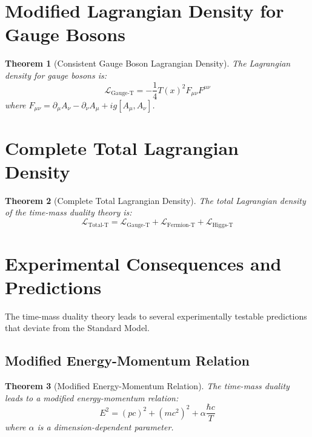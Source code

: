 \documentclass[a4paper,12pt]{article}
\newtheorem{theorem}{Theorem}[section]
\begin{document}
	\section{Modified Lagrangian Density for Gauge Bosons}
	
	\begin{theorem}[Consistent Gauge Boson Lagrangian Density]
		The Lagrangian density for gauge bosons is:
		\begin{equation}
			\mathcal{L}_{\text{Gauge-T}} = -\frac{1}{4} T(x)^2 F_{\mu\nu} F^{\mu\nu}
		\end{equation}
		where \( F_{\mu\nu} = \partial_\mu A_\nu - \partial_\nu A_\mu + i g [A_\mu, A_\nu] \).
	\end{theorem}
	
	\section{Complete Total Lagrangian Density}
	
	\begin{theorem}[Complete Total Lagrangian Density]
		The total Lagrangian density of the time-mass duality theory is:
		\begin{equation}
			\mathcal{L}_{\text{Total-T}} = \mathcal{L}_{\text{Gauge-T}} + \mathcal{L}_{\text{Fermion-T}} + \mathcal{L}_{\text{Higgs-T}}
		\end{equation}
	\end{theorem}
	
	\section{Experimental Consequences and Predictions}
	
	The time-mass duality theory leads to several experimentally testable predictions that deviate from the Standard Model.
	
	\subsection{Modified Energy-Momentum Relation}
	
	\begin{theorem}[Modified Energy-Momentum Relation]
		The time-mass duality leads to a modified energy-momentum relation:
		\begin{equation}
			E^2 = (p c)^2 + (m c^2)^2 + \alpha \frac{\hbar c}{T}
		\end{equation}
		where \( \alpha \) is a dimension-dependent parameter.
	\end{theorem}
	
\end{document}
